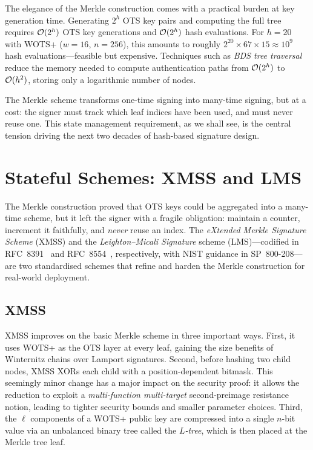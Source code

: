 The elegance of the Merkle construction comes with a practical burden at key generation time.  Generating $2^h$ OTS key pairs and computing the full tree requires $\mathcal{O}(2^h)$ OTS key generations and $\mathcal{O}(2^h)$ hash evaluations.  For $h = 20$ with WOTS+ ($w = 16$, $n = 256$), this amounts to roughly $2^{20} \times 67 \times 15 \approx 10^9$ hash evaluations---feasible but expensive.  Techniques such as \emph{BDS tree traversal}~\cite{BDS2008} reduce the memory needed to compute authentication paths from $\mathcal{O}(2^h)$ to $\mathcal{O}(h^2)$, storing only a logarithmic number of nodes.

The Merkle scheme transforms one-time signing into many-time signing, but at a cost: the signer must track which leaf indices have been used, and must never reuse one.  This state management requirement, as we shall see, is the central tension driving the next two decades of hash-based signature design.


\section{Stateful Schemes: XMSS and LMS}
\label{sec:stateful}

The Merkle construction proved that OTS keys could be aggregated into a many-time scheme, but it left the signer with a fragile obligation: maintain a counter, increment it faithfully, and \emph{never} reuse an index.  The \emph{eXtended Merkle Signature Scheme} (XMSS) and the \emph{Leighton--Micali Signature} scheme (LMS)---codified in RFC~8391~\cite{RFC8391} and RFC~8554~\cite{RFC8554}, respectively, with NIST guidance in SP~800-208---are two standardised schemes that refine and harden the Merkle construction for real-world deployment.

\subsection{XMSS}
\label{subsec:xmss}

XMSS improves on the basic Merkle scheme in three important ways.  First, it uses WOTS+ as the OTS layer at every leaf, gaining the size benefits of Winternitz chains over Lamport signatures.  Second, before hashing two child nodes, XMSS XORs each child with a position-dependent bitmask.  This seemingly minor change has a major impact on the security proof: it allows the reduction to exploit a \emph{multi-function multi-target} second-preimage resistance notion, leading to tighter security bounds and smaller parameter choices.  Third, the $\ell$ components of a WOTS+ public key are compressed into a single $n$-bit value via an unbalanced binary tree called the \emph{$L$-tree}, which is then placed at the Merkle tree leaf.

